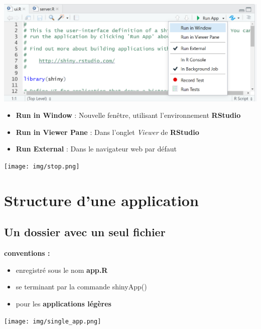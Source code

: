 \documentclass[
]{article}
\providecommand{\tightlist}{%
  \setlength{\itemsep}{0pt}\setlength{\parskip}{0pt}}
\begin{document}
\includegraphics{img/run_app.png}

\begin{itemize}
\tightlist
\item
  \textbf{Run in Window} : Nouvelle fenêtre, utilisant l'environnement
  \textbf{RStudio}
\item
  \textbf{Run in Viewer Pane} : Dans l'onglet \emph{Viewer} de
  \textbf{RStudio}
\item
  \textbf{Run External} : Dans le navigateur web par défaut
\end{itemize}

\texttt{[image: img/stop.png]}

\hypertarget{structure-dune-application}{%
\section{Structure d'une application}\label{structure-dune-application}}

\hypertarget{un-dossier-avec-un-seul-fichier}{%
\subsection{Un dossier avec un seul
fichier}\label{un-dossier-avec-un-seul-fichier}}

\textbf{conventions :}

\begin{itemize}
\tightlist
\item
  enregistré sous le nom \textbf{app.R}
\item
  se terminant par la commande shinyApp()
\item
  pour les \textbf{applications légères}
\end{itemize}

\texttt{[image: img/single\_app.png]}
\end{document}
